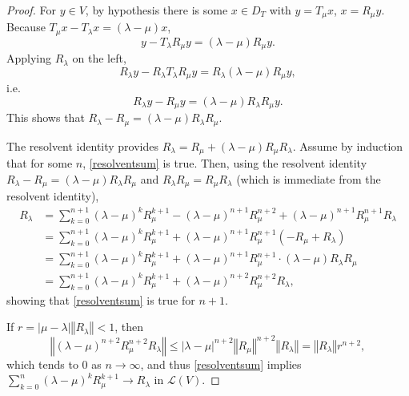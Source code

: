 \documentclass{article}
\newcommand{\norm}[1]{\left\Vert #1 \right\Vert}
\theoremstyle{definition}
\begin{document}
\begin{proof}
For $y \in V$, by hypothesis there is some $x \in D_T$ with $y=T_\mu x$, $x=R_\mu y$. 
Because
$T_\mu x - T_\lambda x = (\lambda - \mu)x$,
\[
y - T_\lambda R_\mu y = (\lambda - \mu)R_\mu y.
\]
Applying $R_\lambda$ on the left,
\[
R_\lambda y - R_\lambda T_\lambda R_\mu y = R_\lambda (\lambda-\mu)R_\mu y,
\]
i.e.
\[
R_\lambda y - R_\mu y = (\lambda-\mu)R_\lambda R_\mu y.
\]
This shows that $R_\lambda - R_\mu = (\lambda-\mu)R_\lambda R_\mu$. 

The resolvent identity provides $R_\lambda = R_\mu + (\lambda-\mu) R_\mu R_\lambda$. Assume by induction that for some $n$,
\eqref{resolventsum} is true. Then, using the resolvent identity $R_\lambda-R_\mu=(\lambda-\mu)R_\lambda R_\mu$ and $R_\lambda R_\mu = R_\mu R_\lambda$ (which
is immediate from the resolvent identity),
\begin{align*}
R_\lambda &= \sum_{k=0}^{n+1} (\lambda-\mu)^k R_\mu^{k+1}-(\lambda-\mu)^{n+1} R_\mu^{n+2}+(\lambda-\mu)^{n+1}R_\mu^{n+1}R_\lambda\\
&=\sum_{k=0}^{n+1} (\lambda-\mu)^k R_\mu^{k+1} + (\lambda-\mu)^{n+1}R_\mu^{n+1} (-R_\mu+R_\lambda)\\
&=\sum_{k=0}^{n+1} (\lambda-\mu)^k R_\mu^{k+1} + (\lambda-\mu)^{n+1}R_\mu^{n+1} \cdot (\lambda-\mu)R_\lambda R_\mu\\
&=\sum_{k=0}^{n+1} (\lambda-\mu)^k R_\mu^{k+1} + (\lambda-\mu)^{n+2} R_\mu^{n+2} R_\lambda,
\end{align*}
showing that \eqref{resolventsum} is true for $n+1$. 

If $r=|\mu-\lambda| \norm{R_\lambda}<1$, then 
\[
\norm{ (\lambda-\mu)^{n+2} R_\mu^{n+2} R_\lambda}
\leq |\lambda-\mu|^{n+2} \norm{R_\mu}^{n+2} \norm{R_\lambda}
=\norm{R_\lambda} r^{n+2}, 
\]
which tends to $0$ as $n \to \infty$, and thus \eqref{resolventsum} implies $\sum_{k=0}^n (\lambda-\mu)^k R_\mu^{k+1} \to R_\lambda$ in 
$\mathscr{L}(V)$. 


\end{proof}
\end{document}
